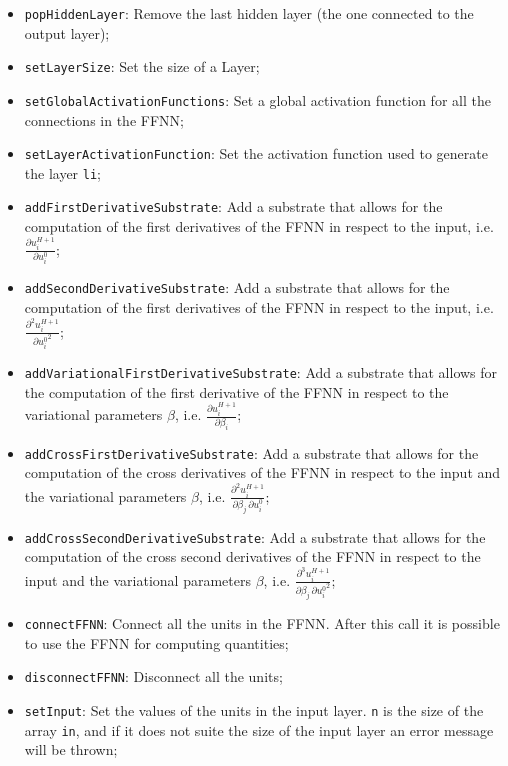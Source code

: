 \documentclass[11pt,a4paper,twoside]{article}
\begin{document}
\begin{itemize}
\item \verb+popHiddenLayer+: Remove the last hidden layer (the one connected to the output layer);
\item \verb+setLayerSize+: Set the size of a Layer;
\item \verb+setGlobalActivationFunctions+: Set a global activation function for all the connections in the FFNN;
\item \verb+setLayerActivationFunction+: Set the activation function used to generate the layer \verb+li+;
\item \verb+addFirstDerivativeSubstrate+: Add a substrate that allows for the computation of the first derivatives of the FFNN in respect to the input, i.e. $\frac{\partial u^{H+1}_i}{\partial u^0_i}$;
\item \verb+addSecondDerivativeSubstrate+: Add a substrate that allows for the computation of the first derivatives of the FFNN in respect to the input, i.e. $\frac{\partial^2 u^{H+1}_i}{\partial {u^0_i}^2}$;
\item \verb+addVariationalFirstDerivativeSubstrate+: Add a substrate that allows for the computation of the first derivative of the FFNN in respect to the variational parameters $\beta$, i.e. $\frac{\partial u^{H+1}_i}{\partial \beta_{i}}$;
\item \verb+addCrossFirstDerivativeSubstrate+: Add a substrate that allows for the computation of the cross derivatives of the FFNN in respect to the input and the variational parameters $\beta$, i.e. $\frac{\partial^2 u^{H+1}_i}{\partial \beta_{j} \, \partial {u^0_i}}$;
\item \verb+addCrossSecondDerivativeSubstrate+: Add a substrate that allows for the computation of the cross second derivatives of the FFNN in respect to the input and the variational parameters $\beta$, i.e. $\frac{\partial^3 u^{H+1}_i}{\partial \beta_{j} \, \partial {u^0_i}^2}$;
\item \verb+connectFFNN+: Connect all the units in the FFNN. After this call it is possible to use the FFNN for computing quantities;
\item \verb+disconnectFFNN+: Disconnect all the units;
\item \verb+setInput+: Set the values of the units in the input layer. \verb+n+ is the size of the array \verb+in+, and if it does not suite the size of the input layer an error message will be thrown;

\end{itemize}
\end{document}
